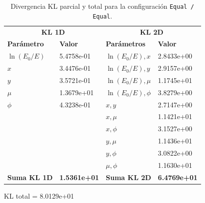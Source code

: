 \begin{table}[H]
    \centering
    \caption{Divergencia KL parcial y total para la configuración \texttt{Equal / Equal}.}
    \label{tab:KL_parciales_adaptativo}
    \begin{tabular}{ll@{\hspace{2cm}}ll}
    \toprule
    \multicolumn{2}{c}{\textbf{KL 1D}} & \multicolumn{2}{c}{\textbf{KL 2D}} \\
    \cmidrule(lr){1-2} \cmidrule(lr){3-4}
    \textbf{Parámetro} & \textbf{Valor} & \textbf{Parámetros} & \textbf{Valor} \\
    \midrule
    $\ln(E_0/E)$ & 5.4758e-01 & $\ln(E_0/E), x$ & 2.8433e+00 \\
    $x$ & 3.4476e-01 & $\ln(E_0/E), y$ & 2.9157e+00 \\
    $y$ & 3.5721e-01 & $\ln(E_0/E), \mu$ & 1.1745e+01 \\
    $\mu$ & 1.3679e+01 & $\ln(E_0/E), \phi$ & 3.8279e+00 \\
    $\phi$ & 4.3238e-01 & $x, y$ & 2.7147e+00 \\
    & & $x, \mu$ & 1.1421e+01 \\
    & & $x, \phi$ & 3.1527e+00 \\
    & & $y, \mu$ & 1.1436e+01 \\
    & & $y, \phi$ & 3.0822e+00 \\
    & & $\mu, \phi$ & 1.1630e+01 \\
    \midrule
    \textbf{Suma KL 1D} & \textbf{1.5361e+01} & \textbf{Suma KL 2D} & \textbf{6.4769e+01} \\
    \bottomrule
    \end{tabular}
    \vspace{0.5em}
    
    KL total = 8.0129e+01
\end{table}





